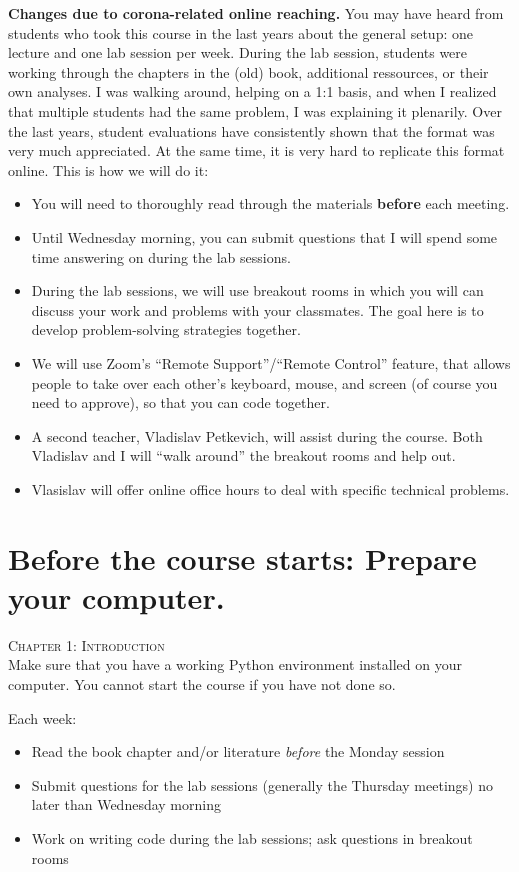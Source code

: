 \begin{corona}\noindent \textbf{Changes due to corona-related online reaching.} You may have heard from students who took this course in the last years about the general setup: one lecture and one lab session per week. During the lab session, students were working through the chapters in the (old) book,  additional ressources, or their own analyses. I was walking around, helping on a 1:1 basis, and when I realized that multiple students had the same problem, I was explaining it plenarily. Over the last years, student evaluations have consistently shown that the format was very much appreciated. At the same time, it is very hard to replicate this format online.
	This is how we will do it:

	\begin{itemize}
		\item You will need to thoroughly read through the materials \textbf{before} each meeting.
		\item Until Wednesday morning, you can submit questions that I will spend some time answering on during the lab sessions.
		\item During the lab sessions, we will use breakout rooms in which you will can discuss your work and problems with your classmates. The goal here is to develop problem-solving strategies together.
		\item We will use Zoom's ``Remote Support''/``Remote Control'' feature, that allows people to take over each other's keyboard, mouse, and screen (of course you need to approve), so that you can code together.
		\item A second teacher, Vladislav Petkevich, will assist during the course. Both Vladislav and I will ``walk around'' the breakout rooms and help out.
		\item Vlasislav will offer online office hours to deal with specific technical problems.
	\end{itemize}
\end{corona}

\section*{Before the course starts: Prepare your computer.}
\textsc{ Chapter 1: Introduction}\\
Make sure that you have a working Python environment installed on your computer. You cannot start the course if you have not done so.

\begin{corona}
	Each week:
	\begin{itemize}
		\item Read the book chapter and/or literature \emph{before} the Monday session
		\item Submit questions for the lab sessions (generally the Thursday meetings) no later than Wednesday morning
		\item Work on writing code during the lab sessions; ask questions in breakout rooms
	\end{itemize}
\end{corona}

